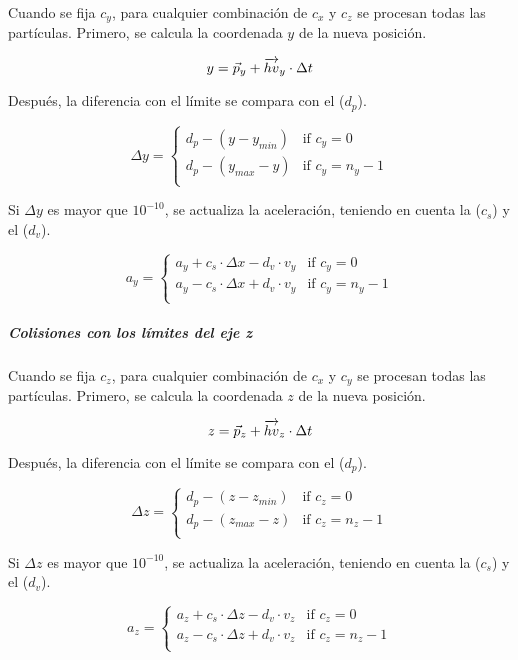 Cuando se fija $c_y$, para cualquier combinación de $c_x$ y $c_z$ se
procesan todas las partículas. Primero, se calcula la coordenada $y$ de la 
nueva posición.

\[
y = \vec{p}_y + \overrightarrow{hv}_y \cdot \Delta t \\
\]

Después, la diferencia con el límite se compara con el  ($d_p$).

\[
\Delta y = 
\begin{cases}
d_p - (y - y_{min}) & \text{if } c_y = 0\\
d_p - (y_{max} - y) & \text{if } c_y = n_y -1\\
\end{cases}
\]

Si $\Delta y$ es mayor que $10^{-10}$, se actualiza la aceleración,
teniendo en cuenta la  ($c_s$) y el
 ($d_v$).

\[
a_y = 
\begin{cases}
  a_y + c_s \cdot \Delta x - d_v \cdot v_y & \text{if  } c_y = 0\\
  a_y - c_s \cdot \Delta x + d_v \cdot v_y & \text{if  } c_y = n_y-1\\
\end{cases}
\]

\subparagraph{Colisiones con los límites del eje z}

Cuando se fija $c_z$, para cualquier combinación de $c_x$ y $c_y$ se
procesan todas las partículas. Primero, se calcula la coordenada $z$ de la 
nueva posición.

\[
z = \vec{p}_z + \overrightarrow{hv}_z \cdot \Delta t \\
\]

Después, la diferencia con el límite se compara con el  ($d_p$).

\[
\Delta z = 
\begin{cases}
d_p - (z - z_{min}) & \text{if } c_z = 0\\
d_p - (z_{max} - z) & \text{if } c_z = n_z -1\\
\end{cases}
\]

Si $\Delta z$ es mayor que $10^{-10}$, se actualiza la aceleración,
teniendo en cuenta la  ($c_s$) y el
 ($d_v$).

\[
a_z = 
\begin{cases}
  a_z + c_s \cdot \Delta z - d_v \cdot v_z & \text{if  } c_z = 0\\
  a_z - c_s \cdot \Delta z + d_v \cdot v_z & \text{if  } c_z = n_z-1\\
\end{cases}
\]
